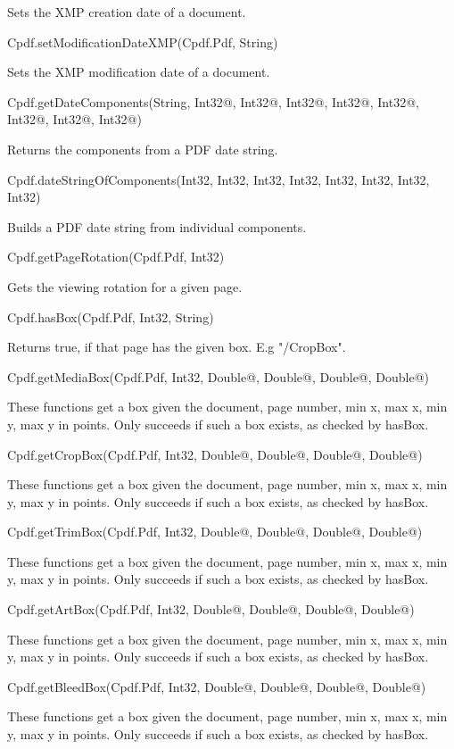Sets the XMP creation date of a document.


Cpdf.setModificationDateXMP(Cpdf.Pdf, String)


Sets the XMP modification date of a document.


Cpdf.getDateComponents(String, Int32@, Int32@, Int32@, Int32@, Int32@, Int32@, Int32@, Int32@)


Returns the components from a PDF date string.


Cpdf.dateStringOfComponents(Int32, Int32, Int32, Int32, Int32, Int32, Int32, Int32)


Builds a PDF date string from individual
components.


Cpdf.getPageRotation(Cpdf.Pdf, Int32)


Gets the viewing rotation for a
given page.


Cpdf.hasBox(Cpdf.Pdf, Int32, String)


Returns true, if that page has the
given box. E.g "/CropBox".


Cpdf.getMediaBox(Cpdf.Pdf, Int32, Double@, Double@, Double@, Double@)


These functions get a box given the document, page number, min x, max x, 
min y, max y in points. Only succeeds if such a box exists, as checked by
hasBox.


Cpdf.getCropBox(Cpdf.Pdf, Int32, Double@, Double@, Double@, Double@)


These functions get a box given the document, page number, min x, max x, 
min y, max y in points. Only succeeds if such a box exists, as checked by
hasBox.


Cpdf.getTrimBox(Cpdf.Pdf, Int32, Double@, Double@, Double@, Double@)


These functions get a box given the document, page number, min x, max x, 
min y, max y in points. Only succeeds if such a box exists, as checked by
hasBox.


Cpdf.getArtBox(Cpdf.Pdf, Int32, Double@, Double@, Double@, Double@)


These functions get a box given the document, page number, min x, max x, 
min y, max y in points. Only succeeds if such a box exists, as checked by
hasBox.


Cpdf.getBleedBox(Cpdf.Pdf, Int32, Double@, Double@, Double@, Double@)


These functions get a box given the document, page number, min x, max x, 
min y, max y in points. Only succeeds if such a box exists, as checked by
hasBox.


